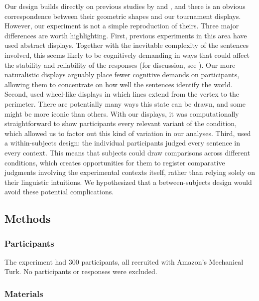 \documentclass[leqno,12pt]{article}
\begin{document}
Our design builds directly on previous studies by
\citet{Geurts:Pouscoulous:2009} and \citet{Chemla:Spector:2011}, and
there is an obvious correspondence between their geometric shapes and
our tournament displays. However, our experiment is not a simple
reproduction of theirs. Three major differences are worth
highlighting. First, previous experiments in this area have used
abstract displays. Together with the inevitable complexity
of the sentences involved, this seems likely to be cognitively
demanding in ways that could affect the stability and reliability of
the responses (for discussion, see \citealt{Clifton:Dube:2010}). Our
more naturalistic displays arguably place fewer cognitive demands on
participants, allowing them to concentrate on how well the sentences
identify the world.  Second, \citeauthor{Chemla:Spector:2011} used
wheel-like displays in which lines extend from the vertex to the
perimeter. There are potentially many ways this state can be drawn,
and some might be more iconic than others. With our displays, it was
computationally straightforward to show participants every relevant
variant of the condition, which allowed us to factor out this kind of
variation in our analyses.  Third, \citeauthor{Chemla:Spector:2011}
used a within-subjects design: the individual participants judged
every sentence in every context. This means that subjects could draw
comparisons across different conditions, which creates opportunities
for them to register comparative judgments involving the experimental
contexts itself, rather than relying solely on their linguistic
intuitions. We hypothesized that a between-subjects design would avoid
these potential complications.


\subsection{Methods}

\subsubsection{Participants}

The experiment had 300 participants, all recruited with Amazon's
Mechanical Turk. No participants or responses were excluded.

\subsubsection{Materials}
\end{document}
